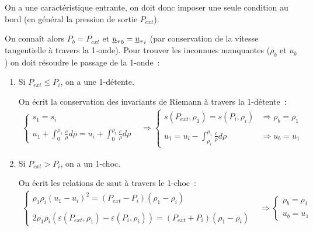 On a une caract\'eristique entrante,
on doit donc imposer une seule condition  au bord
(en g\'en\'eral la pression de sortie $P_{ext}$).

On conna\^it alors $P_b = P_{ext}$ et ${\underline{u}_\tau}_b = {\underline{u}_\tau}_i$
(par conservation de la vitesse tangentielle \`a travers la 1-onde).
Pour trouver les inconnues manquantes ($\rho_b$ et $u_b$)
on doit r\'esoudre le passage de la 1-onde~:

\begin{enumerate}

\item Si $P_{ext} \leqslant P_i$,
on a une 1-d\'etente.

On \'ecrit la conservation
des invariants de Riemann \`a travers la 1-d\'etente~:
\begin{equation}
\begin{array}{lll}
\left\{\begin{array}{l}
s_1 = s_i\\
\\
u_1 + \displaystyle\int_0^{\rho_1} \frac{c}{\rho} d\rho
= u_i + \displaystyle\int_0^{\rho_i} \frac{c}{\rho} d\rho
\end{array}\right.
&
\Rightarrow
\left\{\begin{array}{ll}
s(P_{ext},\rho_1) = s(P_i,\rho_i)
& \Rightarrow \rho_b=\rho_1\\
\\
u_1 = u_i - \displaystyle\int_{\rho_i}^{\rho_1} \frac{c}{\rho} d\rho
& \Rightarrow u_b = u_1
\end{array}\right.
\end{array}
\end{equation}

\item Si $P_{ext} > P_i$,
on a un 1-choc.

On \'ecrit les relations de saut \`a travers le 1-choc~:
\begin{equation}
\begin{array}{lll}
\left\{\begin{array}{l}
\rho_1 \rho_i (u_1 - u_i)^2
= (P_{ext} - P_i)(\rho_1 - \rho_i)\\
\\
2\rho_1 \rho_i (\varepsilon(P_{ext},\rho_1) - \varepsilon(P_i,\rho_i))
= (P_{ext} + P_i)(\rho_1 - \rho_i)
\end{array}\right.
&
\Rightarrow
\left\{\begin{array}{l}
\rho_b=\rho_1\\
\\
u_b = u_1
\end{array}\right.
\end{array}
\end{equation}


\end{enumerate}
